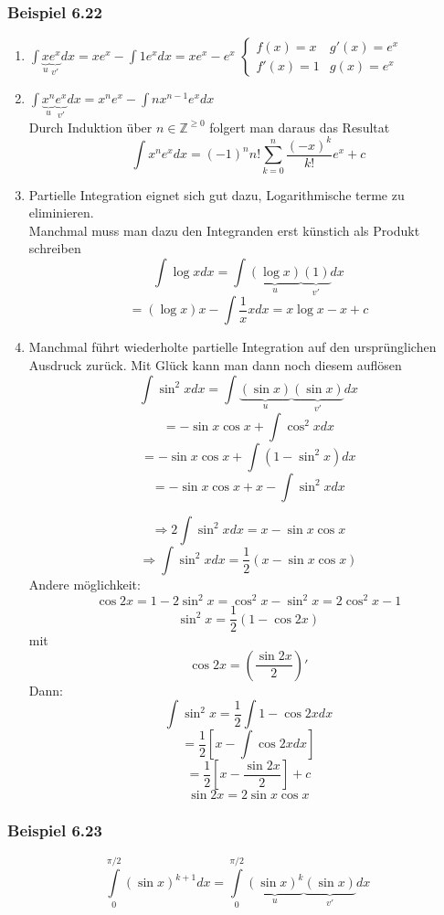 \subsubsection*{Beispiel 6.22}
\begin{enumerate}
\item $\int {\underbrace x_u\underbrace {{e^x}}_{v'}dx = x{e^x} - \int {1{e^x}dx} } =x e^x - e^x$
$\left\{\begin{array}{cc} f(x)=x & g'(x)=e^x \\ f'(x)=1 & g(x)=e^x\end{array}\right.$

\item $\int {\underbrace {{x^n}}_u\underbrace {{e^x}}_{v'}dx = {x^n}{e^x} - \int {n{x^{n - 1}}{e^x}dx} } $\\
Durch Induktion über $n\in\mathbb{Z}^{\geq 0}$ folgert man daraus das Resultat \[\int {{x^n}{e^x}dx = {{( - 1)}^n}n!\sum\limits_{k = 0}^n {\frac{{{{( - x)}^k}}}{{k!}}{e^x} + c} } \]

\item Partielle Integration eignet sich gut dazu, Logarithmische terme zu eliminieren.\\
Manchmal muss man dazu den Integranden erst künstich als Produkt schreiben
\[\int {\log xdx = \int {\underbrace {(\log x)}_u\underbrace {(1)}_{v'}dx} } \]
\[ = (\log x)x - \int {\frac{1}{x}} xdx = x\log x - x + c\]

\item Manchmal führt wiederholte partielle Integration auf den ursprünglichen Ausdruck zurück. Mit Glück kann man dann noch diesem auflösen 
\[\int {{{\sin }^2}xdx = \int {\underbrace {(\sin x)}_u\underbrace {(\sin x)}_{v'}dx} } \]
$$ =  - \sin x\cos x + \int {{{\cos }^2}xdx}$$
$$ =  - \sin x\cos x + \int {(1 - {{\sin }^2}x)dx}$$
$$ =  - \sin x\cos x + x - \int {{{\sin }^2}xdx} $$

\[ \Rightarrow 2\int {{{\sin }^2}xdx = x - \sin x\cos x} \]
\[ \Rightarrow \int {{{\sin }^2}xdx = \frac{1}{2}\left( {x - \sin x\cos x}  \right)} \]
Andere möglichkeit:
$$\cos 2x = 1-2\sin^2x=\cos^2x-\sin^2x=2\cos^2x-1$$
$$\sin^2x=\frac{1}{2}(1-\cos 2x)$$
mit $$\cos 2x=\left(\frac{\sin 2x}{2} \right)'$$
Dann: $$\int{\sin^2 x}=\frac{1}{2}\int{1-\cos 2x dx}$$
$$=\frac{1}{2}\left[ x-\int{\cos 2x dx}\right]$$
$$=\frac{1}{2}\left[ x-\frac{\sin 2x}{2}\right] +c$$
$$\sin 2x =2\sin x\cos x$$
\end{enumerate}

\subsubsection*{Beispiel 6.23}
\[\int\limits_0^{\pi /2} {{{(\sin x)}^{k + 1}}dx = \int\limits_0^{\pi /2} {\underbrace {{{(\sin x)}^k}}_u\underbrace {(\sin x)}_{v'}dx} } \]


